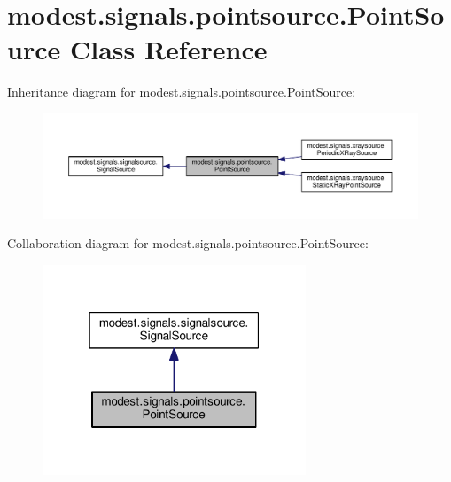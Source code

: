 \hypertarget{classmodest_1_1signals_1_1pointsource_1_1PointSource}{}\section{modest.\+signals.\+pointsource.\+Point\+Source Class Reference}
\label{classmodest_1_1signals_1_1pointsource_1_1PointSource}


Inheritance diagram for modest.\+signals.\+pointsource.\+Point\+Source\+:\nopagebreak
\begin{figure}[H]
\begin{center}
\leavevmode
\includegraphics[width=350pt]{classmodest_1_1signals_1_1pointsource_1_1PointSource__inherit__graph}
\end{center}
\end{figure}


Collaboration diagram for modest.\+signals.\+pointsource.\+Point\+Source\+:\nopagebreak
\begin{figure}[H]
\begin{center}
\leavevmode
\includegraphics[width=223pt]{classmodest_1_1signals_1_1pointsource_1_1PointSource__coll__graph}
\end{center}
\end{figure}
